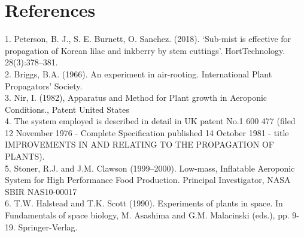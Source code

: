 \documentclass{article}
\begin{document}
\section{References}
1.	Peterson, B. J., S. E. Burnett, O. Sanchez. (2018). ‘Sub-mist is effective for propagation of Korean lilac and inkberry by stem cuttings’. HortTechnology. 28(3):378–381.\\
2.	Briggs, B.A. (1966). An experiment in air-rooting. International Plant Propagators' Society.\\
3.	Nir, I. (1982), Apparatus and Method for Plant growth in Aeroponic Conditions., Patent United States\\
4.	The system employed is described in detail in UK patent No.1 600 477 (filed 12 November 1976 - Complete Specification published 14 October 1981 - title IMPROVEMENTS IN AND RELATING TO THE PROPAGATION OF PLANTS).\\
5.	Stoner, R.J. and J.M. Clawson (1999–2000). Low-mass, Inflatable Aeroponic System for High Performance Food Production. Principal Investigator, NASA SBIR NAS10-00017\\
6.	T.W. Halstead and T.K. Scott (1990). Experiments of plants in space. In Fundamentals of space biology, M. Asashima and G.M. Malacinski (eds.), pp. 9-19. Springer-Verlag.
\end{document}
